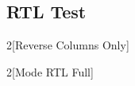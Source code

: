 \documentclass{article}
\begin{document}
\subsection*{RTL Test}

\RLmulticolcolumns
{}
\begin{multicols}{2}[Reverse Columns Only]
  \lipsum[1]
\end{multicols}

\begin{RTL}
  \begin{multicols}{2}[Mode RTL Full]
    \lipsum[1]
  \end{multicols}
\end{RTL}
\end{document}
